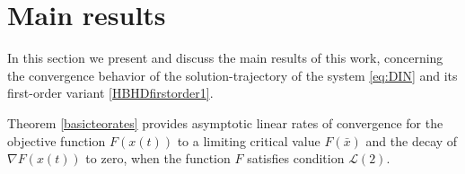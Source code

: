\documentclass[reqno]{amsart}
\theoremstyle{plain}
\theoremstyle{definition}
\theoremstyle{remark}
\DeclarePairedDelimiter{\norm}{\lVert}{\rVert}	%
\newcommand{\VA}{\VAcomment}
\newcommand{\Rb}{\mathcal{R}}
\newcommand{\VM}[1]{}
\begin{document}



\section{Main results}
\label{sec:results}


In this section we present and discuss the main results of this work, concerning the convergence behavior of the solution-trajectory of the system \eqref{eq:DIN} and its first-order variant \eqref{HBHDfirstorder1}. 

\VM{Slightly restating: In this Section we present and discuss the main results of this work, regarding the convergence behavior of the solution-trajectory of the system \eqref{eq:DIN} and its first-order variant \eqref{HBHDfirstorder1}. More precisely, Theorem \ref{basicteorates} provides asymptotic linear rates of convergence for the objective function $F(x(t))$ to a limiting critical value $F(\bar{x})$ and guarantees the decay of $\nabla F(x(t))$ to zero. Lastly, provides an explicit formula of the geometric convergence rate  $\Rb(\alpha,\beta)$, for the gap $F(x(t))-F(\bar{x})$, as also for $\norm{\nabla F(x(t))}$, depending on the friction parameters $\alpha$ and $\beta$. Note that we are always under the assumption that $F$ satisfies condition \ref{PL} with $q=2$.}


Theorem \ref{basicteorates} provides asymptotic linear rates of convergence for the objective function $F(x(t))$ to a limiting critical value $F(\bar{x})$ and the decay of $\nabla F(x(t))$ to zero, when the function $F$ satisfies condition \hyperref[PL]{$\mathcal{L}(2)$}.
\end{document}
